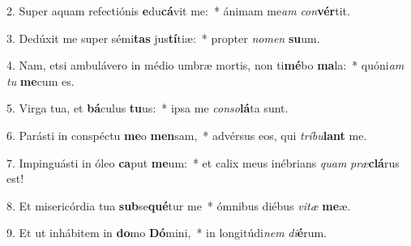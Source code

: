 2. Super aquam refectiónis \textbf{e}du\textbf{cá}vit me:~*  ánimam me\textit{am} \textit{con}\textbf{vér}tit.\

3. Dedúxit me super sémi\textbf{tas} jus\textbf{tí}tiæ:~*  propter \textit{no}\textit{men} \textbf{su}um.\

4. Nam, etsi ambulávero in médio umbræ mortis, non ti\textbf{mé}bo \textbf{ma}la:~*  quóni\textit{am} \textit{tu} \textbf{me}cum es.\

5. Virga tua, et \textbf{bá}culus \textbf{tu}us:~*  ipsa me \textit{con}\textit{so}\textbf{lá}ta sunt.\

6. Parásti in conspéctu \textbf{me}o \textbf{men}sam,~*  advérsus eos, qui \textit{trí}\textit{bu}\textbf{lant} me.\

7. Impinguásti in óleo \textbf{ca}put \textbf{me}um:~*  et calix meus inébrians \textit{quam} \textit{præ}\textbf{clá}rus est!\

8. Et misericórdia tua \textbf{sub}se\textbf{qué}tur me~*  ómnibus diébus \textit{vi}\textit{tæ} \textbf{me}æ.\

9. Et ut inhábitem in \textbf{do}mo \textbf{Dó}mini,~*  in longitúdi\textit{nem} \textit{di}\textbf{é}rum.\

